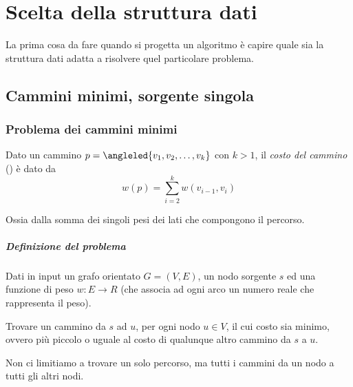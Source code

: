 
\ifsubfile
\pagestyle{plain}
\setcounter{chapter}{10}


\fi
\chapter{Scelta della struttura dati}

\begin{note}
La prima cosa da fare quando si progetta un algoritmo è capire quale sia la struttura dati adatta a risolvere quel particolare problema.
\end{note}

\section{Cammini minimi, sorgente singola}

\subsection{Problema dei cammini minimi}

\begin{definition}
Dato un cammino \(p = \angleled{v_1, v_2, \ldots, v_k}\) con \(k > 1\), il \emph{costo del cammino} () è dato da
\begin{equation*}
w(p) = \sum_{i=2}^k w(v_{i-1}, v_i)
\end{equation*}
\end{definition}
Ossia dalla somma dei singoli pesi dei lati che compongono il percorso.

\paragraph{Definizione del problema}
Dati in input un grafo orientato \(G = (V, E)\), un nodo sorgente \(s\) ed una funzione di peso \(w \colon E \to R\) (che associa ad ogni arco un numero reale che rappresenta il peso).

Trovare un cammino da \(s\) ad \(u\), per ogni nodo \(u \in V\), il cui costo sia minimo, ovvero più piccolo o uguale al costo di qualunque altro cammino da \(s\) a \(u\).

\begin{note}
Non ci limitiamo a trovare un solo percorso, ma tutti i cammini da un nodo a tutti gli altri nodi.
\end{note}

